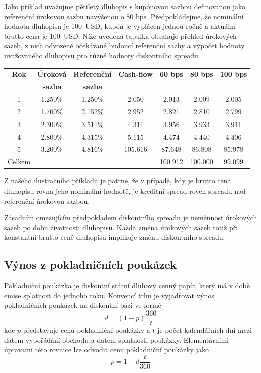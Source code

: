 \documentclass[a4paper]{book}
\begin{document}
Jako příklad uvažujme pětiletý dluhopis s kupónovou sazbou definovanou jako referenční úrokovou sazbu navýšenou o 80 bps. Předpokládejme, že nominální hodnota dluhopisu je 100~USD, kupón je vyplácen jednou ročně a aktuální brutto cena je 100~USD. Níže uvedená tabulka obsahuje přehled úrokových sazeb, z nich odvozené očekávané budoucí referenční sazby a výpočet hodnoty uvažovaného dluhopisu pro různé hodnoty diskontního spreadu.
\begin{center}
\begin{tabular}{c c c c c c c}
\textbf{Rok} & \textbf{Úroková} & \textbf{Referenční} & \textbf{Cash-flow} & \textbf{60 bps} & \textbf{80 bps} & \textbf{100 bps}\\
 & \textbf{sazba} & \textbf{sazba} & & & & \\ 
\hline
1 & 1.250\% & 1.250\% &   2.050 &   2.013 &   2.009 &  2.005 \\
2 & 1.700\% & 2.152\% &   2.952 &   2.821 &   2.810 &  2.799 \\
3 & 2.300\% & 3.511\% &   4.311 &   3.956 &   3.933 &  3.911 \\
4 & 2.800\% & 4.315\% &   5.115 &   4.474 &   4.440 &  4.406 \\
5 & 3.200\% & 4.816\% & 105.616 &  87.648 &  86.808 & 85.978 \\
Celkem  &         &         &	        & 100.912 & 100.000 & 99.099 \\
\end{tabular}
\end{center}
Z našeho ilustračního příkladu je patrné, že v případě, kdy je brutto cena dluhopisu rovna jeho nominální hodnotě, je kreditní spread roven spreadu nad referenční úrokovou sazbou.

Zásadním omezujícím předpokladem diskontního spreadu je neměnnost úrokových sazeb po dobu životnosti dluhopisu. Každá změna úrokových sazeb totiž při konstantní brutto ceně dluhopisu implikuje změnu diskontního spreadu.

\subsection{Výnos z pokladničních poukázek}

Pokladniční poukázka je diskontní státní dluhový cenný papír, který má v době emise splatnost do jednoho roku. Konvencí trhu je vyjadřovat výnos pokladničních poukázek na diskontní bázi ve formě
\begin{equation*}
d = (1 - p)\frac{360}{t}
\end{equation*}
kde $p$ představuje cenu pokladniční poukázky a $t$ je počet kalendářních dní mezi datem vypořádání obchodu a datem splatnosti poukázky. Elementárními úpravami této rovnice lze odvodit cenu pokladniční poukázky jako
\begin{equation*}
p = 1 - d \frac{t}{360}
\end{equation*}
\end{document}
